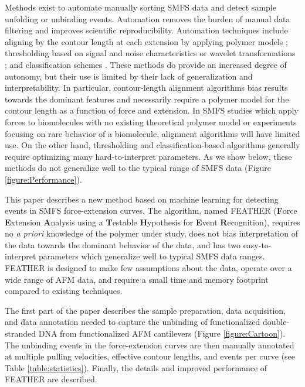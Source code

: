 \documentclass[%
  aip,12pt,tightenlines,
  amsthm,
 amsmath,amssymb
]{article}
\newcommand{\tRef}[1]{Table \ref{table:#1}}
\newcommand{\fRef}[1]{Figure \ref{figure:#1}}
\newcommand{\pl}[0]{\vspace{6pt}}
\newcommand{\name}[0]{FEATHER}
\newcommand{\acronym}[0]{\textbf{F}orce \textbf{E}xtension \textbf{A}nalysis using a \textbf{T}estable \textbf{H}ypothesis for \textbf{E}vent \textbf{R}ecognition}
\newcommand{\singlemol}[0]{SMFS}
\begin{document}
Methods exist to automate manually sorting \singlemol{} data and detect sample unfolding or unbinding events. Automation removes the burden of manual data filtering and improves scientific reproducibility. Automation techniques include aligning by the contour length at each extension by applying polymer models \cite{kuhn_automated_2005,bosshart_reference-free_2012}; thresholding based on signal and noise characteristics \cite{gergely_semi-automatized_2001,roduit_openfovea:_2012} or wavelet transformations \cite{garcia-masso_automated_2016,benitez_searching_2017}; and classification schemes \cite{kasas_fuzzy_2000}. These methods do provide an increased degree of autonomy, but their use is limited by their lack of generalization and interpretability. In particular, contour-length alignment algorithms bias results towards the dominant features and necessarily require a polymer model for the contour length as a function of force and extension. In \singlemol{} studies which apply forces to biomolecules with no existing theoretical polymer model or experiments focusing on rare behavior of a biomolecule, alignment algorithms will have limited use.  On the other hand, thresholding and classification-based algorithms generally require optimizing many hard-to-interpret parameters. As we show below, these methods do not generalize well to the typical range of \singlemol{} data (\fRef{Performance}).\pl

This paper describes a new method based on machine learning for detecting events in \singlemol{} force-extension curves.  The algorithm, named \name{} (\acronym{}), requires no \emph{a priori} knowledge of the polymer under study, does not bias interpretation of the data towards the dominant behavior of the data, and has two easy-to-interpret parameters which generalize well to typical \singlemol{} data ranges. \name{} is designed to make few assumptions about the data, operate over a wide range of AFM data, and require a small time and memory footprint compared to existing techniques.\pl

 The first part of the paper describes the sample preparation, data acquisition, and data annotation needed to capture the unbinding of functionalized double-stranded DNA from functionalized AFM cantilevers (\fRef{Cartoon}).  The unbinding events in the force-extension curves are then manually annotated at multiple pulling velocities, effective contour lengths, and events per curve (see \tRef{statistics}). Finally, the details and improved performance of \name{} are described. \pl
\end{document}
